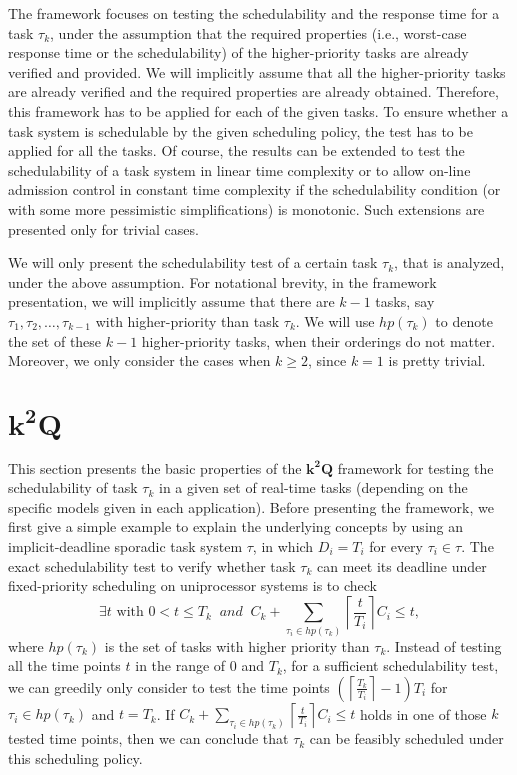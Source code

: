 \documentclass[10pt,conference]{IEEEtran}
\newcommand{\ceiling}[1]{\left\lceil{#1}\right\rceil}
\newcommand{\frameworkkq}[1]{$\mathbf{k^2Q}$}
\begin{document}
The framework focuses on testing the schedulability and the response
time for a task $\tau_k$, under the assumption that the
required properties (i.e., worst-case response time or the
schedulability) of the higher-priority tasks are already verified and
provided. We will implicitly assume that all the higher-priority tasks
are already verified and the required properties are already obtained.
Therefore, this framework has to be applied for each of the given
tasks. To ensure whether a task system is schedulable by the given
scheduling policy, the test has to be applied for all the tasks.  Of
course, the results can be extended to test the schedulability of a
task system in linear time complexity or to allow on-line admission
control in constant time complexity if the schedulability condition
(or with some more pessimistic simplifications) is monotonic. Such
extensions are presented only for trivial cases.


We will only present the schedulability test of a certain task
$\tau_k$, that is analyzed, under the above assumption. For
notational brevity, in the framework presentation, we will implicitly
assume that there are $k-1$ tasks, say $\tau_1, \tau_2, \ldots,
\tau_{k-1}$ with higher-priority than task $\tau_k$. We will use
$hp(\tau_k)$ to denote the set of these $k-1$ higher-priority tasks,
when their orderings do not matter. Moreover, we only
consider the cases when $k \geq 2$, since $k=1$ is pretty trivial.


\section{\frameworkkq{}}
\label{sec:framework}

This section presents the basic properties of the \frameworkkq{}
framework for testing the schedulability of task $\tau_k$ in a given
set of real-time tasks (depending on the specific models given in each
application). Before presenting the
framework, we first give a simple example to explain the underlying
concepts by using an
implicit-deadline sporadic task system $\tau$, in which $D_i =
T_i$ for every $\tau_i \in \tau$. The exact schedulability test to
verify whether task $\tau_k$ can meet its deadline under
fixed-priority scheduling on uniprocessor systems is to check
\begin{equation}
\label{eq:TDA-implicit}
\exists t \mbox{ with } 0 < t \leq T_k {\;\; and \;\;} C_k +
\sum_{\tau_i \in hp(\tau_k)} \ceiling{\frac{t}{T_i}}C_i \leq t,
\end{equation}
where $hp(\tau_k)$ is the set of tasks with higher priority than
$\tau_k$. Instead of testing all the time points $t$ in the range of
$0$ and $T_k$, for a sufficient schedulability test, we can greedily
only consider to test the time points $(\ceiling{\frac{T_k}{T_i}}-1)T_i$ for
$\tau_i \in hp(\tau_k)$ and $t=T_k$. If $ C_k + \sum_{\tau_i \in
  hp(\tau_k)} \ceiling{\frac{t}{T_i}}C_i \leq t$ holds in one of those
$k$ tested time points, then we can conclude that $\tau_k$ can be feasibly
scheduled under this scheduling policy.
\end{document}
